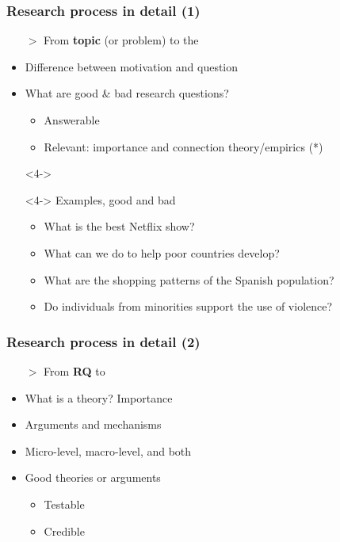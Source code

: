 \documentclass[aspectratio=43]{beamer}
\begin{document}
\begin{frame}
\frametitle{Research process in detail (1)}
\centering

\begin{itemize}
  \item[$>$] From \textbf{topic} (or problem) to the 
  \item[]
  \item<2-> Difference between motivation and question
  \item<3-> What are good \& bad research questions?
  \begin{itemize}
    \item Answerable
    \item Relevant: importance and connection theory/empirics (*)
  \end{itemize}
  \item[]<4->
  \item[]<4-> Examples, good and bad
  \begin{itemize}
    \item What is the best Netflix show?
    \item What can we do to help poor countries develop?
    \item What are the shopping patterns of the Spanish population?
    \item Do individuals from minorities support the use of violence?
  \end{itemize}
\end{itemize}

\end{frame}

\begin{frame}
\frametitle{Research process in detail (2)}
\centering

\begin{itemize}
  \item[$>$] From \textbf{RQ} to 
  \item[]
  \item<2-> What is a theory? Importance
  \item<3-> Arguments and mechanisms
  \item<3-> Micro-level, macro-level, and both
  \item<4-> Good theories or arguments
  \begin{itemize}
    \item Testable
    \item Credible
  \end{itemize}
\end{itemize}

\end{frame}
\end{document}
